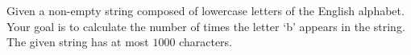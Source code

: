 
Given a non-empty string composed of lowercase letters of the English alphabet.
Your goal is to calculate the number of times the letter `b' appears in the string.
The given string has at most $1000$ characters.